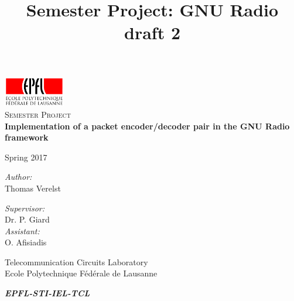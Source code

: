 \documentclass[a4paper,12pt]{article}
\begin{document}
\begin{titlepage}
 \begin{center}
  \includegraphics[width=0.2\textwidth]{logo_epfl.png}\\[1cm]
 
\Large \textsc{Semester Project}\\[2cm]

{ \huge \bfseries Implementation of a packet encoder/decoder pair in the GNU Radio framework}\\[2cm]

\title{Semester Project: GNU Radio draft 2}

Spring 2017\\[2cm]
\begin{minipage}{0.4\textwidth}
\begin{flushleft} \large
\emph{Author:}\\
Thomas Verelst
\end{flushleft}
\end{minipage}
\begin{minipage}{0.4\textwidth}
\begin{flushright} \large
\emph{Supervisor:} \\
Dr. P. Giard
\\[0.5cm]
\emph{Assistant:} \\
O. Afisiadis
\end{flushright}
\end{minipage}
\vfill

\begin{minipage}{0.45\textwidth}
\small{Telecommunication Circuits Laboratory}\\
\small{Ecole Polytechnique F\'ed\'erale de Lausanne}
\end{minipage}
\begin{minipage}{0.45\textwidth}
\begin{flushright}
\large{\textbf{\textit{EPFL-STI-IEL-TCL}}}
\end{flushright}
\end{minipage}
 \end{center}
\end{titlepage}
\end{document}
